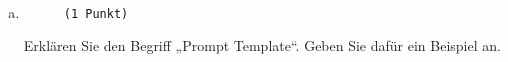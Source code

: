 \documentclass[12pt, ngerman]{AssignmentClass}
\begin{document}
    \begin{answerbox}
		\noindent
		\fbox{\parbox[c]{\textwidth}{
				\vspace{8cm}
				\hspace{\textwidth}
		}}\\
	\end{answerbox}

    \begin{enumerate}[b)]
		\item 
			\begin{minipage}[t]{\linewidth}
				\vspace{-0.61em}
				\begin{figure} 
					\raggedleft
					\texttt{(1 Punkt)}
				\end{figure}
                Erklären Sie den Begriff „Prompt Template“. Geben Sie dafür ein Beispiel an.
			\end{minipage}
	\end{enumerate}
 
	\begin{solution}
		\noindent
		\\
	\end{solution}

    \begin{answerbox}
		\noindent
		\fbox{\parbox[c]{\textwidth}{
				\vspace{3cm}
				\hspace{\textwidth}
		}}\\
	\end{answerbox}
\end{document}
